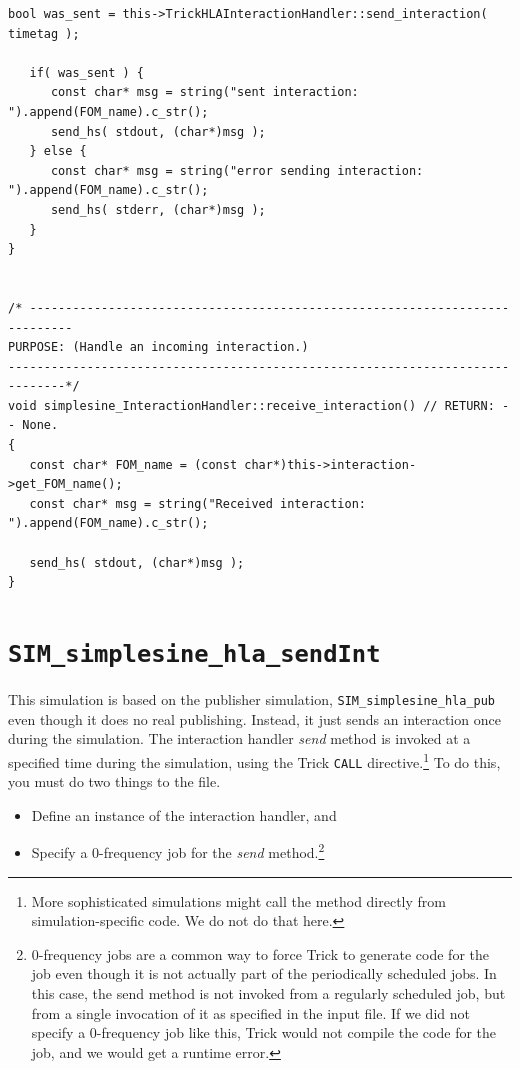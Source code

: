 \begin{lstlisting}[caption={{\tt simplesine\_InteractionHandler} methods},label={list:simplesine-interaction-handler-methods}]
   bool was_sent = this->TrickHLAInteractionHandler::send_interaction( timetag );

   if( was_sent ) {
      const char* msg = string("sent interaction: ").append(FOM_name).c_str();
      send_hs( stdout, (char*)msg );
   } else {
      const char* msg = string("error sending interaction: ").append(FOM_name).c_str();
      send_hs( stderr, (char*)msg );
   }
}


/* ----------------------------------------------------------------------------
PURPOSE: (Handle an incoming interaction.)
------------------------------------------------------------------------------*/
void simplesine_InteractionHandler::receive_interaction() // RETURN: -- None.
{
   const char* FOM_name = (const char*)this->interaction->get_FOM_name();
   const char* msg = string("Received interaction: ").append(FOM_name).c_str();

   send_hs( stdout, (char*)msg );
}
\end{lstlisting}

\section{\tt SIM\_simplesine\_hla\_sendInt}

This simulation is based on the publisher simulation,
{\tt SIM\_simplesine\_hla\_pub} even though it does no real publishing.
Instead, it just sends an interaction once during the simulation.
The interaction handler {\em send} method is invoked at a specified
time during the simulation, using the Trick {\tt CALL} directive.\footnote{
  More sophisticated simulations might call the method
  directly from simulation-specific code.
  We do not do that here.
}
To do this, you must do two things to the \sdefine file.

\begin{itemize}
\item{
  Define an instance of the interaction handler, and
}
\item{
  Specify a 0-frequency job for the {\em send} method.\footnote{
    0-frequency jobs are a common way to force Trick to generate
    code for the job even though it is not actually part of the
    periodically scheduled jobs.
    In this case,
    the send method is not invoked from a regularly scheduled job,
    but from a single invocation of it as specified in the input file.
    If we did not specify a 0-frequency job like this, Trick would
    not compile the code for the job, and we would get a runtime error.
  }
}
\end{itemize}

